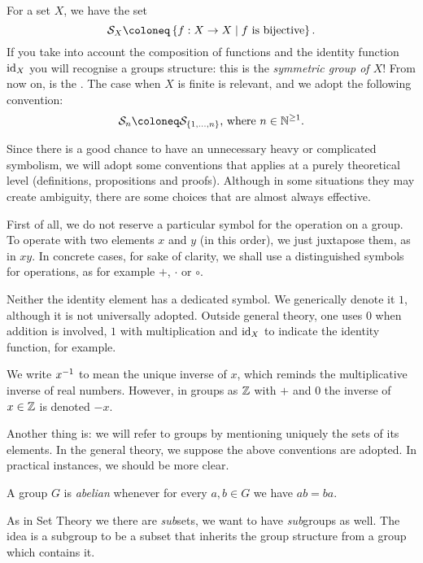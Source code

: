 \begin{example}
For a set \(X\), we have the set
\[\cals_X \coloneq \set{f : X \to X \mid f \text{ is bijective}} .\]
If you take into account the composition of functions and the identity function \(\text{id}_X\) you will recognise a groups structure: this is the {\em symmetric group of \(X\)}! From now on,  is the . The case when \(X\) is finite is relevant, and we adopt the following convention:
\[\cals_n \coloneq \cals_{\set{1, \dots{}, n}} \text{, where } n \in \nn^{\ge 1} .\]
\end{example}

Since there is a good chance to have an unnecessary heavy or complicated symbolism, we will adopt some conventions that applies at a purely theoretical level (definitions, propositions and proofs). Although in some situations they may create ambiguity, there are some choices that are almost always effective.

First of all, we do not reserve a particular symbol for the operation on a group. To operate with two elements \(x\) and \(y\) (in this order), we just juxtapose them, as in \(xy\). In concrete cases, for sake of clarity, we shall use a distinguished symbols for operations, as for example \(+\), \(\cdot\) or \(\circ\).

Neither the identity element has a dedicated symbol. We generically denote it \(1\), although it is not universally adopted. Outside general theory, one uses \(0\) when addition is involved, \(1\) with multiplication and \(\text{id}_X\) to indicate the identity function, for example.

We write \(x^{-1}\) to mean the unique inverse of \(x\), which reminds the multiplicative inverse of real numbers. However, in groups as \(\mathbb Z\) with \(+\) and \(0\) the inverse of \(x \in \mathbb Z\) is denoted \(-x\).

Another thing is: we will refer to groups by mentioning uniquely the sets of its elements. In the general theory, we suppose the above conventions are adopted. In practical instances, we should be more clear.

\begin{definition}
A group \(G\) is {\em abelian} whenever for every \(a, b \in G\) we have \(ab= ba\).
\end{definition}

As in Set Theory we there are {\em sub}sets, we want to have {\em sub}groups as well. The idea is a subgroup to be a subset that inherits the group structure from a group which contains it.

